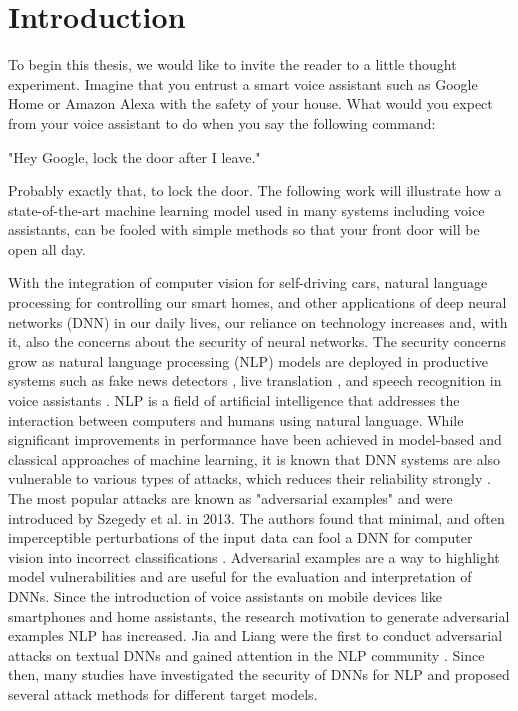 
\section{Introduction}

To begin this thesis, we would like to invite the reader to a little thought experiment. Imagine that you entrust a smart voice assistant such as Google Home or Amazon Alexa with the safety of your house. What would you expect from your voice assistant to do when you say the following command:

"Hey Google, lock the door after I leave."

Probably exactly that, to lock the door. The following work will illustrate how a state-of-the-art machine learning model used in many systems including voice assistants, can be fooled with simple methods so that your front door will be open all day. 

With the integration of computer vision for self-driving cars, natural language processing for controlling our smart homes, and other applications of deep neural networks (DNN) in our daily lives, our reliance on technology increases and, with it, also the concerns about the security of neural networks. The security concerns grow as natural language processing (NLP) models are deployed in productive systems such as fake news detectors \cite{singhania20173han}, live translation \cite{zhang2015deep}, and speech recognition in voice assistants \cite{deng2013new}. NLP is a field of artificial intelligence that addresses the interaction between computers and humans using natural language.  
While significant improvements in performance have been achieved in model-based and classical approaches of machine learning, it is known that DNN systems are also vulnerable to various types of attacks, which reduces their reliability strongly \cite{papernot2018sok}. The most popular attacks are known as "adversarial examples" and were introduced by Szegedy et al. in 2013. The authors found that minimal, and often imperceptible perturbations of the input data can fool a DNN for computer vision into incorrect classifications \cite{szegedy2013intriguing}.
Adversarial examples are a way to highlight model vulnerabilities and are useful for the evaluation and interpretation of DNNs. 
Since the introduction of voice assistants on mobile devices like smartphones and home assistants, the research motivation to generate adversarial examples NLP has increased. Jia and Liang were the first to conduct adversarial attacks on textual DNNs and gained attention in the NLP community \cite{Jia2017AdversarialEF}. Since then, many studies have investigated the security of DNNs for NLP and proposed several attack methods for different target models. 

